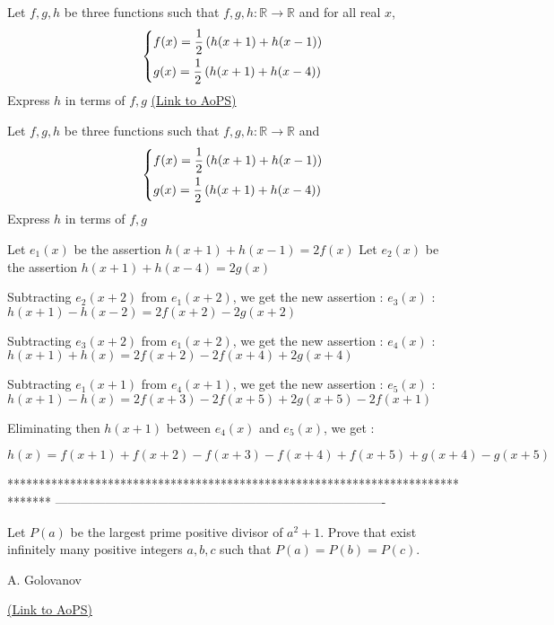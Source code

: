 \begin{problem}
	Let $f, g, h$ be three functions such that $f, g, h: \mathbb{R} \to \mathbb{R}$ and for all real $x$,
\[\left\{ \begin{gathered}
  f(x) = \frac{1}
{2}\left( {h(x + 1) + h(x - 1)} \right) \hfill \\
  g(x) = \frac{1}
{2}\left( {h(x + 1) + h(x - 4)} \right) \hfill \\ 
\end{gathered}  \right.\]
Express $h$ in terms of $f, g$
	\flushright \href{https://artofproblemsolving.com/community/c6h403948}{(Link to AoPS)}
\end{problem}



\begin{solution}
	\begin{tcolorbox}Let $f, g, h$ be three functions such that $f, g, h: \mathbb{R} \to \mathbb{R}$ and \[\left\{ \begin{gathered}
  f(x) = \frac{1}
{2}\left( {h(x + 1) + h(x - 1)} \right) \hfill \\
  g(x) = \frac{1}
{2}\left( {h(x + 1) + h(x - 4)} \right) \hfill \\ 
\end{gathered}  \right.\]
Express $h$ in terms of $f, g$\end{tcolorbox}
Let $e_1(x)$ be the assertion $h(x+1)+h(x-1)=2f(x)$
Let $e_2(x)$ be the assertion $h(x+1)+h(x-4)=2g(x)$

Subtracting $e_2(x+2)$ from $e_1(x+2)$, we get the new assertion :
$e_3(x)$ : $h(x+1)-h(x-2)=2f(x+2)-2g(x+2)$

Subtracting $e_3(x+2)$ from $e_1(x+2)$, we get the new assertion :
$e_4(x)$ : $h(x+1)+h(x)=2f(x+2)-2f(x+4)+2g(x+4)$

Subtracting $e_1(x+1)$ from $e_4(x+1)$, we get the new assertion :
$e_5(x)$ : $h(x+1)-h(x)=2f(x+3)-2f(x+5)+2g(x+5)-2f(x+1)$

Eliminating then $h(x+1)$ between $e_4(x)$ and $e_5(x)$, we get :

$\boxed{h(x)=f(x+1)+f(x+2)-f(x+3)-f(x+4)+f(x+5)+g(x+4)-g(x+5)}$
\end{solution}
*******************************************************************************
-------------------------------------------------------------------------------

\begin{problem}
	Let $P(a)$ be the largest prime positive divisor of $a^2 + 1$. Prove that exist infinitely many positive integers $a, b, c$ such that $P(a)=P(b)=P(c)$.

\begin{italicized}A. Golovanov\end{italicized}
	\flushright \href{https://artofproblemsolving.com/community/c6h404321}{(Link to AoPS)}
\end{problem}



